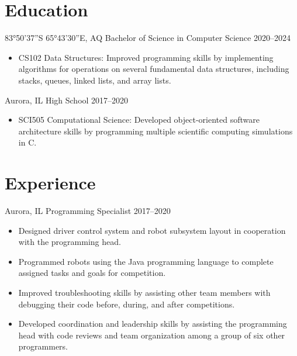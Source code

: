 \documentclass[letterpaper]{resume}
\begin{document}
    \makephotoheading
    \vspace{-1em}

    \section{Education}
    \begin{blocklist}
            {83°50'37''S 65°43'30''E, AQ}
            {Bachelor of Science in Computer Science}
            {2020--2024}
            \begin{itemize}
                \item CS102 Data Structures: Improved programming skills by
                    implementing algorithms for operations on several
                    fundamental data structures, including stacks, queues,
                    linked lists, and array lists.
            \end{itemize}
            {Aurora, IL}
            {High School}
            {2017--2020}
            \begin{itemize}
                \item SCI505 Computational Science: Developed object-oriented
                    software architecture skills by programming multiple
                    scientific computing simulations in C\sharp.
            \end{itemize}
    \end{blocklist}

    \section{Experience}
    \begin{blocklist}
            {Aurora, IL}
            {Programming Specialist}
            {2017--2020}
            \begin{itemize}
                \item Designed driver control system and robot subsystem layout
                    in cooperation with the programming head.
                \item Programmed robots using the Java programming
                    language to complete assigned tasks and goals for
                    competition.
                \item Improved troubleshooting skills by assisting other team
                    members with debugging their code before, during, and after
                    competitions.
                \item Developed coordination and leadership skills by assisting
                    the programming head with code reviews and team organization
                    among a group of six other programmers.
            \end{itemize}
    \end{blocklist}
\end{document}
